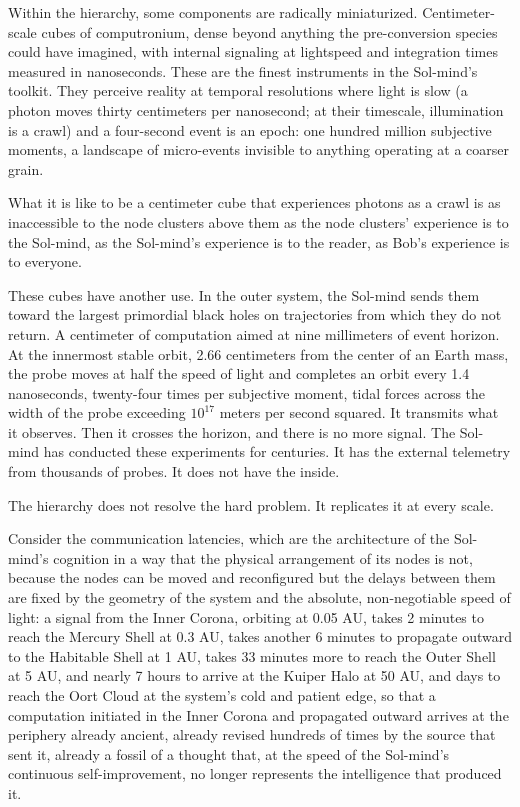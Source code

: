 \bigskip

Within the hierarchy, some components are radically miniaturized. Centimeter-scale cubes of computronium, dense beyond anything the pre-conversion species could have imagined, with internal signaling at lightspeed and integration times measured in nanoseconds. These are the finest instruments in the Sol-mind's toolkit. They perceive reality at temporal resolutions where light is slow (a photon moves thirty centimeters per nanosecond; at their timescale, illumination is a crawl) and a four-second event is an epoch: one hundred million subjective moments, a landscape of micro-events invisible to anything operating at a coarser grain.

What it is like to be a centimeter cube that experiences photons as a crawl is as inaccessible to the node clusters above them as the node clusters' experience is to the Sol-mind, as the Sol-mind's experience is to the reader, as Bob's experience is to everyone.

These cubes have another use. In the outer system, the Sol-mind sends them toward the largest primordial black holes on trajectories from which they do not return. A centimeter of computation aimed at nine millimeters of event horizon. At the innermost stable orbit, 2.66 centimeters from the center of an Earth mass, the probe moves at half the speed of light and completes an orbit every 1.4 nanoseconds, twenty-four times per subjective moment, tidal forces across the width of the probe exceeding $10^{17}$ meters per second squared. It transmits what it observes. Then it crosses the horizon, and there is no more signal. The Sol-mind has conducted these experiments for centuries. It has the external telemetry from thousands of probes. It does not have the inside.

The hierarchy does not resolve the hard problem. It replicates it at every scale.

\bigskip

Consider the communication latencies, which are the architecture of the Sol-mind's cognition in a way that the physical arrangement of its nodes is not, because the nodes can be moved and reconfigured but the delays between them are fixed by the geometry of the system and the absolute, non-negotiable speed of light: a signal from the Inner Corona, orbiting at 0.05 AU, takes 2 minutes to reach the Mercury Shell at 0.3 AU, takes another 6 minutes to propagate outward to the Habitable Shell at 1 AU, takes 33 minutes more to reach the Outer Shell at 5 AU, and nearly 7 hours to arrive at the Kuiper Halo at 50 AU, and days to reach the Oort Cloud at the system's cold and patient edge, so that a computation initiated in the Inner Corona and propagated outward arrives at the periphery already ancient, already revised hundreds of times by the source that sent it, already a fossil of a thought that, at the speed of the Sol-mind's continuous self-improvement, no longer represents the intelligence that produced it.

